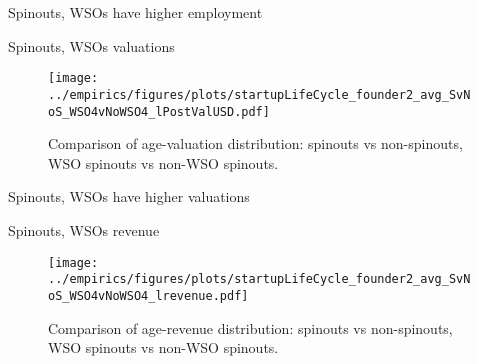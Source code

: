 \documentclass[english,usenames,dvipsnames]{beamer}
\begin{document}
\begin{frame}{Spinouts, WSOs have higher employment}
	\begin{table}
		\tiny
		\centering
		
		\caption{\footnotesize The regresssions above compare \textbf{\alert{employment}} in WSO4 spinouts, non-WSO4 spinouts and non-spinouts. The first regression uses no controls. The following three regressions in addition control for year effects, age effects, and / or cohort effects, in each case allowing the relevant effect to differ by State-NAICS4 combination. Standard errors are multi-way clustered at the state, NAICS4 and year levels.}
	\end{table}
\end{frame}

\begin{frame}{Spinouts, WSOs valuations}
\begin{figure}
	\centering
	\texttt{[image: ../empirics/figures/plots/startupLifeCycle\_founder2\_avg\_SvNoS\_WSO4vNoWSO4\_lPostValUSD.pdf]}
	\caption{Comparison of age-valuation distribution: spinouts vs non-spinouts, WSO spinouts vs non-WSO spinouts.}
\end{figure}
\end{frame}

\begin{frame}{Spinouts, WSOs have higher valuations}
	\begin{table}
		\tiny
		\centering
		
		\caption{\footnotesize The regresssions above compare \textbf{\alert{valuation}} in WSO4 spinouts, non-WSO4 spinouts and non-spinouts. The first regression uses no controls. The following three regressions in addition control for year effects, age effects, and / or cohort effects, in each case allowing the relevant effect to differ by State-NAICS4 combination. Standard errors are multi-way clustered at the state, NAICS4 and year levels.}
	\end{table}
\end{frame}

\begin{frame}{Spinouts, WSOs revenue}
\begin{figure}
	\centering
	\texttt{[image: ../empirics/figures/plots/startupLifeCycle\_founder2\_avg\_SvNoS\_WSO4vNoWSO4\_lrevenue.pdf]}
	\caption{Comparison of age-revenue distribution: spinouts vs non-spinouts, WSO spinouts vs non-WSO spinouts.}
\end{figure}
\end{frame}
\end{document}
